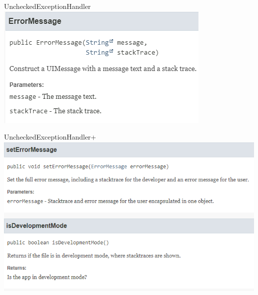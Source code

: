 \documentclass{beamer}
\begin{document}
    \begin{frame}{UncheckedExceptionHandler}
        \centering
        \includegraphics[height=0.5\textheight]{graphics/exc/doc_errormsg}
    \end{frame}
    \begin{frame}{UncheckedExceptionHandler}+
        \centering
        \includegraphics[height=0.6\textheight]{graphics/exc/doc_backing}
    \end{frame}

\end{document}
